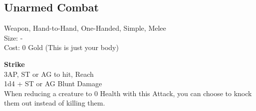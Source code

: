 \subsection{Unarmed Combat}\label{weapon:unarmedCombat}
Weapon, Hand-to-Hand, One-Handed, Simple, Melee\\
Size: -\\
Cost: 0 Gold (This is just your body)

\textbf{Strike}\\
3AP, ST or AG to hit,  Reach\\
1d4 +  ST or AG Blunt Damage\\
When reducing a creature to 0 Health with this Attack, you can choose to knock them out instead of killing them.
